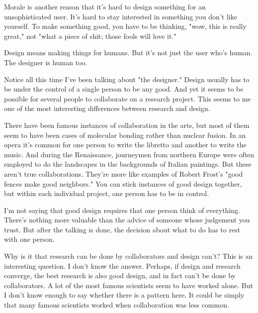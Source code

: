 Morale is another reason that it's hard
                  to design something for an unsophisticated user. It's hard to
                  stay interested in something you don't like yourself. To make
                  something good, you have to be thinking, "wow, this is really
                  great," not "what a piece of shit; those fools will love
                  it."

Design means making things for humans. But
                  it's not just the user who's human. The designer is human
                  too.



Notice all this time I've been
                  talking about "the designer." Design usually has to be under
                  the control of a single person to be any good. And yet it
                  seems to be possible for several people to collaborate on a
                  research project. This seems to me one of the most interesting
                  differences between research and design.

There have
                  been famous instances of collaboration in the arts, but most
                  of them seem to have been cases of molecular bonding rather
                  than nuclear fusion. In an opera it's common for one person to
                  write the libretto and another to write the music. And during
                  the Renaissance, journeymen from northern Europe were often
                  employed to do the landscapes in the backgrounds of Italian
                  paintings. But these aren't true collaborations. They're more
                  like examples of Robert Frost's "good fences make good
                  neighbors." You can stick instances of good design together,
                  but within each individual project, one person has to be in
                  control.

I'm not saying that good design requires
                  that one person think of everything. There's nothing more
                  valuable than the advice of someone whose judgement you trust.
                  But after the talking is done, the decision about what to do
                  has to rest with one person.

Why is it that
                  research can be done by collaborators and design can't? This
                  is an interesting question. I don't know the answer. Perhaps,
                  if design and research converge, the best research is also
                  good design, and in fact can't be done by collaborators. A lot
                  of the most famous scientists seem to have worked alone. But I
                  don't know enough to say whether there is a pattern here. It
                  could be simply that many famous scientists worked when
                  collaboration was less common.


